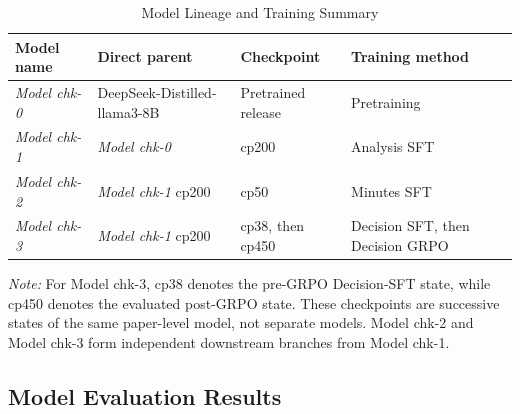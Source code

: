 \begin{table}[htbp]
    \centering
    \caption{Model Lineage and Training Summary}
    \label{tab:ch2:model_training_lineage}
    \footnotesize
    \setlength{\tabcolsep}{6pt}
    \renewcommand{\arraystretch}{1.15}
    \begin{tabularx}{\textwidth}{
        >{\raggedright\arraybackslash}p{}
        >{\raggedright\arraybackslash}p{}
        >{\raggedright\arraybackslash}p{}
        >{\raggedright\arraybackslash}X
    }
        \toprule
        Model name
        & Direct parent
        & Checkpoint
        & Training method \\
        \midrule

        \textit{Model chk-0}
        & DeepSeek-Distilled-llama3-8B
        & Pretrained release
        & Pretraining \\

        \textit{Model chk-1}
        & \textit{Model chk-0}
        & cp200
        & Analysis SFT \\

        \textit{Model chk-2}
        & \textit{Model chk-1} cp200
        & cp50
        & Minutes SFT \\

        \textit{Model chk-3}
        & \textit{Model chk-1} cp200
        & cp38, then cp450
        & Decision SFT, then Decision GRPO \\
        \bottomrule
    \end{tabularx}

    \begin{minipage}{0.97\textwidth}
        \scriptsize
        \textit{Note:} For Model chk-3, cp38 denotes the pre-GRPO
        Decision-SFT state, while cp450 denotes the evaluated post-GRPO
        state. These checkpoints are successive states of the same
        paper-level model, not separate models. Model chk-2 and Model chk-3 form independent downstream branches from Model chk-1.
    \end{minipage}
\end{table}






\subsection*{Model Evaluation Results}

